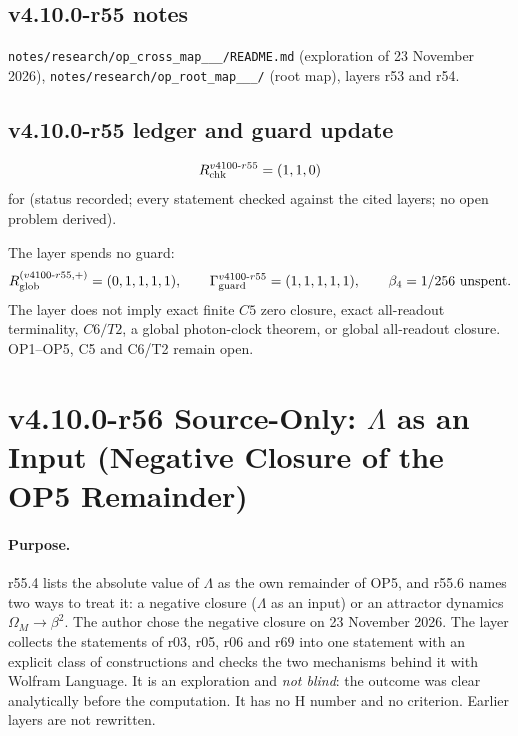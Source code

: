 \subsection*{v4.10.0-r55 notes}
\label{subsec:v4100-r55-notes}

\texttt{notes/\allowbreak research/\allowbreak op\_\allowbreak cross\_\allowbreak map\_\_\_/\allowbreak README.md} (exploration of 23 November 2026),
\texttt{notes/\allowbreak research/\allowbreak op\_\allowbreak root\_\allowbreak map\_\_\_/} (root map), layers r53 and r54.

\subsection*{v4.10.0-r55 ledger and guard update}
\label{subsec:v4100-r55-ledger-guard}

\[
R_{\rm chk}^{v4100\text{-}r55}=(1,1,0)
\]
for (status recorded; every statement checked against the cited layers; no open problem derived).

The layer spends no guard:
\[
R_{\rm glob}^{(v4100\text{-}r55,+)}=(0,1,1,1,1),
\qquad
\Gamma_{\rm guard}^{v4100\text{-}r55}=(1,1,1,1,1),
\qquad
\beta_4=1/256\ \text{unspent}.
\]
The layer does not imply exact finite \(C5\) zero closure, exact all-readout terminality, \(C6/T2\), a global photon-clock theorem,
or global all-readout closure.  OP1--OP5, C5 and C6/T2 remain open.
\clearpage
\section*{v4.10.0-r56 Source-Only: \texorpdfstring{\(\Lambda\)}{Lambda} as an Input (Negative Closure of the OP5 Remainder)}
\label{sec:v4100-r56-lambda-input}

\paragraph{Purpose.}
r55.4 lists the absolute value of \(\Lambda\) as the own remainder of OP5, and r55.6 names two ways to treat it: a negative closure (\(\Lambda\) as an
input) or an attractor dynamics \(\Omega_M\to\beta^2\).  The author chose the negative closure on 23 November 2026.  The layer collects the
statements of r03, r05, r06 and r69 into one statement with an explicit class of constructions and checks the two mechanisms behind it with
Wolfram Language.  It is an exploration and \emph{not blind}: the outcome was clear analytically before the computation.  It has no H number and no
criterion.  Earlier layers are not rewritten.

